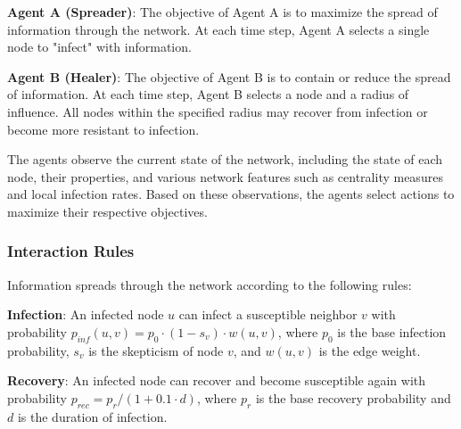 \documentclass[12pt]{article}
\begin{document}
\textbf{Agent A (Spreader)}: The objective of Agent A is to maximize the spread of information through the network. At each time step, Agent A selects a single node to "infect" with information.

\textbf{Agent B (Healer)}: The objective of Agent B is to contain or reduce the spread of information. At each time step, Agent B selects a node and a radius of influence. All nodes within the specified radius may recover from infection or become more resistant to infection.

The agents observe the current state of the network, including the state of each node, their properties, and various network features such as centrality measures and local infection rates. Based on these observations, the agents select actions to maximize their respective objectives.

\subsubsection{Interaction Rules}

Information spreads through the network according to the following rules:

\textbf{Infection}: An infected node $u$ can infect a susceptible neighbor $v$ with probability $p_{inf}(u, v) = p_0 \cdot (1 - s_v) \cdot w(u, v)$, where $p_0$ is the base infection probability, $s_v$ is the skepticism of node $v$, and $w(u, v)$ is the edge weight.

\textbf{Recovery}: An infected node can recover and become susceptible again with probability $p_{rec} = p_r / (1 + 0.1 \cdot d)$, where $p_r$ is the base recovery probability and $d$ is the duration of infection.
\end{document}
